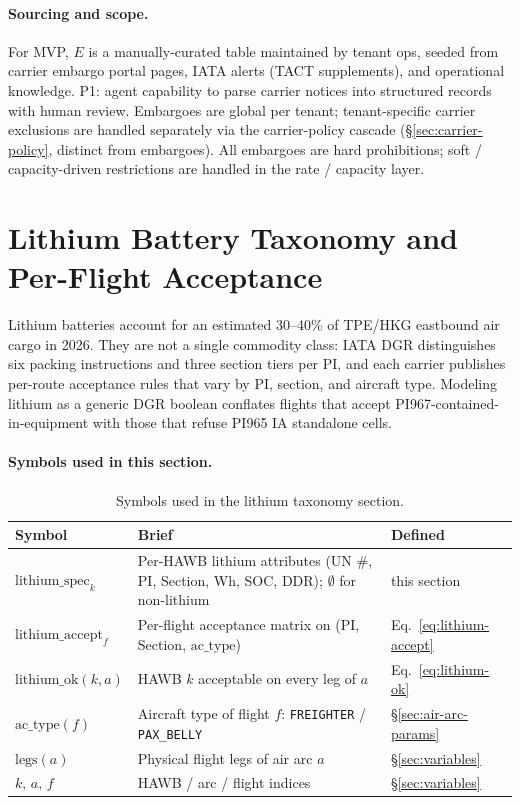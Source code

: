 \documentclass[11pt,a4paper]{article}
\theoremstyle{definition}
\begin{document}
\paragraph{Sourcing and scope.}
For MVP, $E$ is a manually-curated table maintained by tenant ops, seeded from
carrier embargo portal pages, IATA alerts (TACT supplements), and operational
knowledge. P1: agent capability to parse carrier notices into structured
records with human review. Embargoes are global per tenant; tenant-specific
carrier exclusions are handled separately via the carrier-policy cascade
(\S\ref{sec:carrier-policy}, distinct from embargoes). All embargoes are hard
prohibitions; soft / capacity-driven restrictions are handled in the rate /
capacity layer.

\section{Lithium Battery Taxonomy and Per-Flight Acceptance}
\label{sec:lithium}

Lithium batteries account for an estimated 30--40\% of TPE/HKG eastbound air
cargo in 2026. They are not a single commodity class: IATA DGR distinguishes
six packing instructions and three section tiers per PI, and each carrier
publishes per-route acceptance rules that vary by PI, section, and aircraft
type. Modeling lithium as a generic DGR boolean conflates flights that accept
PI967-contained-in-equipment with those that refuse PI965 IA standalone
cells.

\paragraph{Symbols used in this section.}
\begin{table}[H]
\centering
\caption{Symbols used in the lithium taxonomy section.}
\label{tab:lithium-syms}
\begin{tabular}{lp{9cm}p{3.5cm}}
\toprule
Symbol & Brief & Defined \\
\midrule
$\text{lithium\_spec}_k$ & Per-HAWB lithium attributes (UN \#, PI, Section, Wh, SOC, DDR); $\emptyset$ for non-lithium & this section \\
$\text{lithium\_accept}_f$ & Per-flight acceptance matrix on (PI, Section, $\text{ac\_type}$) & Eq.~\ref{eq:lithium-accept} \\
$\text{lithium\_ok}(k, a)$ & HAWB $k$ acceptable on every leg of $a$ & Eq.~\ref{eq:lithium-ok} \\
$\text{ac\_type}(f)$ & Aircraft type of flight $f$: \texttt{FREIGHTER} / \texttt{PAX\_BELLY} & \S\ref{sec:air-arc-params} \\
$\text{legs}(a)$ & Physical flight legs of air arc $a$ & \S\ref{sec:variables} \\
$k,\, a,\, f$ & HAWB / arc / flight indices & \S\ref{sec:variables} \\
\bottomrule
\end{tabular}
\end{table}
\end{document}
